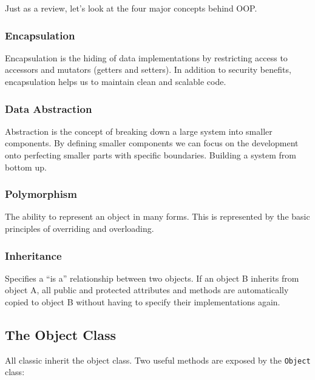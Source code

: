 \documentclass[]{article}
\begin{document}
Just as a review, let's look at the four major concepts behind OOP.

\hypertarget{encapsulation}{%
\subsubsection{Encapsulation}\label{encapsulation}}

Encapsulation is the hiding of data implementations by restricting
access to accessors and mutators (getters and setters). In addition to
security benefits, encapsulation helps us to maintain clean and scalable
code.

\hypertarget{data-abstraction}{%
\subsubsection{Data Abstraction}\label{data-abstraction}}

Abstraction is the concept of breaking down a large system into smaller
components. By defining smaller components we can focus on the
development onto perfecting smaller parts with specific boundaries.
Building a system from bottom up.

\hypertarget{polymorphism}{%
\subsubsection{Polymorphism}\label{polymorphism}}

The ability to represent an object in many forms. This is represented by
the basic principles of overriding and overloading.

\hypertarget{inheritance}{%
\subsubsection{Inheritance}\label{inheritance}}

Specifies a ``is a'' relationship between two objects. If an object B
inherits from object A, all public and protected attributes and methods
are automatically copied to object B without having to specify their
implementations again.

\hypertarget{the-object-class}{%
\subsection{The Object Class}\label{the-object-class}}

All classic inherit the object class. Two useful methods are exposed by
the \texttt{Object} class:
\end{document}
